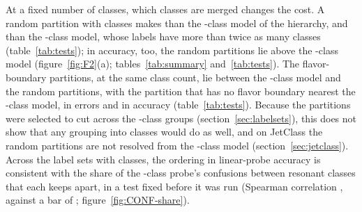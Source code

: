 At a fixed number of classes, which classes are merged changes the cost. A random partition with
\Kcoarse{} classes makes \MlstCmpJcTwoRandOverCoarsePr{} than the \Kcoarse-class model of the
hierarchy, and \MlstCmpJcTwoRandOverMidPr{} than the \Kmid-class model, whose labels have more than twice as
many classes (table~\ref{tab:tests}); in accuracy, too, the random partitions lie above the \Kmid-class
model (figure~\ref{fig:F2}(a); tables~\ref{tab:summary} and~\ref{tab:tests}).
The flavor-boundary partitions, at the same class count, lie between the
\Kcoarse-class model and the random partitions, with the partition that has no flavor boundary nearest
the \Kcoarse-class model, in errors and in accuracy (table~\ref{tab:tests}).
Because the partitions were selected to cut across the \Kcoarse-class groups
(section~\ref{sec:labelsets}), this does not show that any grouping into \Kcoarse{} classes would do as well, and
on JetClass the random partitions are not resolved from the \Kcoarse-class model (section~\ref{sec:jetclass}).
Across the \MlstConfShareNWord{} label sets with \Kcoarse{} classes, the ordering in linear-probe accuracy is
consistent with the share of the \Kfull-class probe's confusions between resonant classes that each keeps apart, in a
test fixed before it was run (Spearman correlation \MlstConfShareRho{}, against a bar of \MlstConfShareBar;
figure~\ref{fig:CONF-share}).

